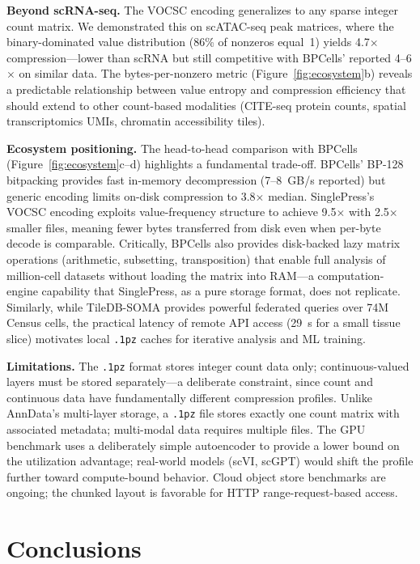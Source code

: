 \documentclass[10pt,twocolumn,letterpaper]{article}
\begin{document}
\textbf{Beyond scRNA-seq.}
The VOCSC encoding generalizes to any sparse integer count matrix.
We demonstrated this on scATAC-seq peak matrices, where the binary-dominated value distribution (86\% of nonzeros equal~1) yields 4.7$\times$ compression---lower than scRNA but still competitive with BPCells' reported 4--6$\times$ on similar data.
The bytes-per-nonzero metric (Figure~\ref{fig:ecosystem}b) reveals a predictable relationship between value entropy and compression efficiency that should extend to other count-based modalities (CITE-seq protein counts, spatial transcriptomics UMIs, chromatin accessibility tiles).

\textbf{Ecosystem positioning.}
The head-to-head comparison with BPCells (Figure~\ref{fig:ecosystem}c--d) highlights a fundamental trade-off.
BPCells' BP-128 bitpacking provides fast in-memory decompression (7--8~GB/s reported) but generic encoding limits on-disk compression to 3.8$\times$ median.
SinglePress's VOCSC encoding exploits value-frequency structure to achieve 9.5$\times$ with 2.5$\times$ smaller files, meaning fewer bytes transferred from disk even when per-byte decode is comparable.
Critically, BPCells also provides disk-backed lazy matrix operations (arithmetic, subsetting, transposition) that enable full analysis of million-cell datasets without loading the matrix into RAM---a computation-engine capability that SinglePress, as a pure storage format, does not replicate.
Similarly, while TileDB-SOMA provides powerful federated queries over 74M Census cells, the practical latency of remote API access (29~s for a small tissue slice) motivates local \texttt{.1pz} caches for iterative analysis and ML training.

\textbf{Limitations.}
The \texttt{.1pz} format stores integer count data only; continuous-valued layers must be stored separately---a deliberate constraint, since count and continuous data have fundamentally different compression profiles.
Unlike AnnData's multi-layer storage, a \texttt{.1pz} file stores exactly one count matrix with associated metadata; multi-modal data requires multiple files.
The GPU benchmark uses a deliberately simple autoencoder to provide a lower bound on the utilization advantage; real-world models (scVI, scGPT) would shift the profile further toward compute-bound behavior.
Cloud object store benchmarks are ongoing; the chunked layout is favorable for HTTP range-request-based access.

\section{Conclusions}
\end{document}

